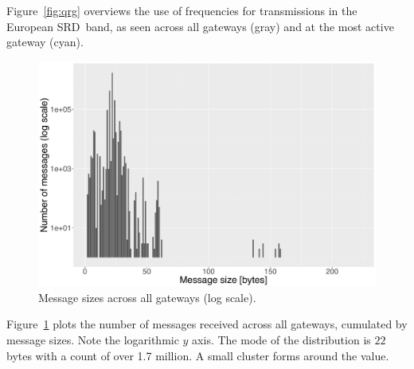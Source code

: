 Figure~\ref{fig:qrg} overviews the use of frequencies for transmissions
in the European \gls{SRD} band, as seen across all gateways (gray) and
at the most active gateway (cyan).




\begin{figure}
  \centering
  \includegraphics[width=\columnwidth]{figures/sizes.pdf}
  \caption{Message sizes across all gateways (log scale).}
  \label{fig:sizes}
\end{figure}

Figure~\ref{fig:sizes} plots the number of messages received across
all gateways, cumulated by message sizes. Note the logarithmic $y$ axis.
The mode of the distribution is $22$ bytes with a count of over 1.7 million.
A small cluster forms around the value.
